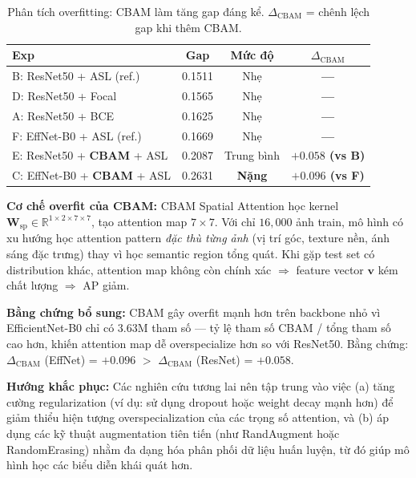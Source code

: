 \documentclass[conference]{IEEEtran}
\begin{document}
\begin{table}[t]
  \caption{Phân tích overfitting: CBAM làm tăng gap đáng kể.
           $\Delta_\text{CBAM}$ = chênh lệch gap khi thêm CBAM.}
  \label{tab:overfitting}
  \centering
  \small
  \begin{tabular}{lcc>{\bfseries}c}
    \toprule
    \textbf{Exp} & \textbf{Gap} & \textbf{Mức độ} & $\Delta_\text{CBAM}$ \\
    \midrule
    B: ResNet50 + ASL (ref.)        & 0.1511 & Nhẹ    & ---       \\
    D: ResNet50 + Focal             & 0.1565 & Nhẹ    & ---       \\
    A: ResNet50 + BCE               & 0.1625 & Nhẹ    & ---       \\
    F: EffNet-B0 + ASL (ref.)       & 0.1669 & Nhẹ    & ---       \\
    E: ResNet50 + \textbf{CBAM} + ASL & 0.2087 & Trung bình & $+0.058$ (vs B) \\
    C: EffNet-B0 + \textbf{CBAM} + ASL & 0.2631 & \textbf{Nặng} & $+0.096$ (vs F) \\
    \bottomrule
  \end{tabular}
\end{table}

\textbf{Cơ chế overfit của CBAM:}
CBAM Spatial Attention học kernel $\mathbf{W}_{\text{sp}} \in \mathbb{R}^{1\times2\times7\times7}$,
tạo attention map $7\times7$.
Với chỉ $16{,}000$ ảnh train, mô hình có xu hướng học attention pattern
\textit{đặc thù từng ảnh} (vị trí góc, texture nền, ánh sáng đặc trưng)
thay vì học semantic region tổng quát.
Khi gặp test set có distribution khác, attention map không còn chính xác
$\Rightarrow$ feature vector $\mathbf{v}$ kém chất lượng $\Rightarrow$ AP giảm.

\textbf{Bằng chứng bổ sung:}
CBAM gây overfit mạnh hơn trên backbone nhỏ vì EfficientNet-B0 chỉ có $3.63\text{M}$
tham số --- tỷ lệ tham số CBAM / tổng tham số cao hơn, khiến attention map
dễ overspecialize hơn so với ResNet50.
Bằng chứng: $\Delta_\text{CBAM}$ (EffNet) = $+0.096$ $>$ $\Delta_\text{CBAM}$ (ResNet) = $+0.058$.

\textbf{Hướng khắc phục:}
Các nghiên cứu tương lai nên tập trung vào việc (a) tăng cường regularization
(ví dụ: sử dụng dropout hoặc weight decay mạnh hơn) để giảm thiểu hiện tượng
overspecialization của các trọng số attention, và (b) áp dụng các kỹ thuật
augmentation tiên tiến (như RandAugment hoặc RandomErasing) nhằm đa dạng hóa
phân phối dữ liệu huấn luyện, từ đó giúp mô hình học các biểu diễn khái quát hơn.
\end{document}
